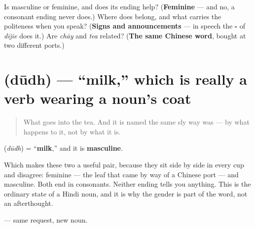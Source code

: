 \begin{tcolorbox}[breakable,colback=teal!4,colframe=teal!35!black,title={Before you move on}]
Is \textbf{} masculine or feminine, and does its ending help? (\textbf{Feminine} — and no, a consonant ending never does.) Where does \textbf{} belong, and what carries the politeness when you speak? (\textbf{Signs and announcements} — in speech the \textbf{-} of \emph{dījie} does it.) Are \emph{chāy} and \emph{tea} related? (\textbf{The same Chinese word}, bought at two different ports.)
\end{tcolorbox}
\section[\texorpdfstring{\hi{दूध} (dūdh)}{दूध (dūdh)}]{ (dūdh) — \textquotedblleft{}milk,\textquotedblright{} which is really a verb wearing a noun's coat}

\label{lesson:HI-C37-dudh}



\begin{quote}
What goes into the tea. And it is named the same sly way \textbf{} was — by what happens to it, not by what it is.
\end{quote}

\begin{grammarlens}[title={Grammar Lens: the pair that disagrees}]
\textbf{} (\emph{dūdh}) = \textquotedblleft{}\textbf{milk},\textquotedblright{} and it is \textbf{masculine}.

Which makes these two a useful pair, because they sit side by side in every cup and disagree: \textbf{} feminine — the leaf that came by way of a Chinese port — and \textbf{} masculine. Both end in consonants. Neither ending tells you anything. This is the ordinary state of a Hindi noun, and it is why the gender is part of the word, not an afterthought.

\textbf{  } — same request, new noun.
\end{grammarlens}

